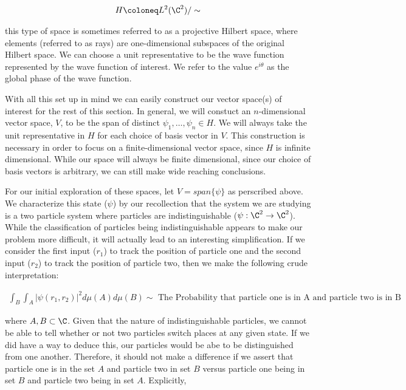 \begin{equation}
	\begin{aligned}
		H \coloneq L^2(\C^2)/\sim
	\end{aligned}
\end{equation}

this type of space is sometimes referred to as a projective Hilbert space, where elements (referred to as rays) are one-dimensional subspaces of the original Hilbert space. We can choose a unit representative to be the wave function represented by the wave function of interest. We refer to the value $e^{i\theta}$ as the global phase of the wave function.

With all this set up in mind we can easily construct our vector space(s) of interest for the rest of this section. In general, we will constuct an $n$-dimensional vector space, $V$, to be the span of distinct $\psi_1,\hdots,\psi_n\in H$. We will always take the unit representative in $H$ for each choice of basis vector in $V$. This construction is necessary in order to focus on a finite-dimensional vector space, since $H$ is infinite dimensional. While our space will always be finite dimensional, since our choice of basis vectors is arbitrary, we can still make wide reaching conclusions. 

For our initial exploration of these spaces, let $V = span\{\psi\}$ as perscribed above. We characterize this state ($\psi$) by our recollection that the system we are studying is a two particle system where particles are indistinguishable ($\psi:\C^2\rightarrow\C^2$). While the classification of particles being indistinguishable appears to make our problem more difficult, it will actually lead to an interesting simplification. If we consider the first input ($r_1$) to track the position of particle one and the second input ($r_2$) to track the position of particle two, then we make the following crude interpretation:

\begin{equation}
	\begin{aligned}
		\int_B \int_A |\psi(r_1,r_2)|^2 d\mu(A)d\mu(B) \sim \text{ The Probability that particle one is in A and particle two is in B}
	\end{aligned}
\end{equation}

where $A,B\subset\C$. Given that the nature of indistinguishable particles, we cannot be able to tell whether or not two particles switch places at any given state. If we did have a way to deduce this, our particles would be abe to be distinguished from one another. Therefore, it should not make a difference if we assert that particle one is in the set $A$ and particle two in set $B$ versus particle one being in set $B$ and particle two being in set $A$. Explicitly,

